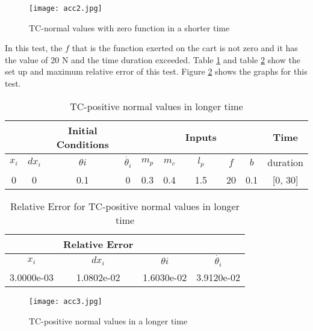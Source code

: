 \documentclass[12pt, titlepage]{article}
\begin{document}
\begin{figure}[H]
\begin{center}
\texttt{[image: acc2.jpg]}
 \caption{TC-normal values with zero function in a shorter time}
 \label{acc1}
 \end{center}
 \end{figure}


In this test, the $f$ that is the function exerted on the cart is not zero and it has the value of 20 \si{\newton} and the time duration exceeded. Table \ref{long} and table \ref{longres} show the set up and maximum relative error of this test. Figure \ref{longe30} shows the graphs for this test.


\begin{table}[ht]
\caption{TC-positive normal values in longer time} \label{long}
\vspace*{2mm}
\centering
 \begin{tabular}{|c c c c|c c c c c|c|} 
 \hline
&&\textbf{Initial Conditions}& &  &  &  \textbf{Inputs} &  &&\textbf{Time}  \\ \hline
$x_i$&$dx_i$&$\theta{i}$&$\dot{\theta_{i}}$ & $m_p$ & $m_c$ & $l_p$ & $f$ & $b$  & duration \\ \hline
0 & 0 & 0.1 & 0 & 0.3 & 0.4 & 1.5 & 20 & 0.1 &[0, 30]\\
 \hline
\end{tabular}
\end{table}	


\begin{table}[ht]
\caption{Relative Error for TC-positive normal values in longer time} \label{longres}
\vspace*{2mm}
\centering
 \begin{tabular}{|c c c c|} 
 \hline
&\textbf{Relative Error}&&\\ \hline
$x_i$&$dx_i$&$\theta{i}$&$\dot{\theta_{i}}$ \\ \hline
3.0000e-03 & 1.0802e-02 & 1.6030e-02 & 3.9120e-02
\\ \hline
\end{tabular}
\end{table}	

\begin{figure}[H]
\begin{center}
\texttt{[image: acc3.jpg]}
 \caption{TC-positive normal values in a longer time}
 \label{longe30}
 \end{center}
 \end{figure}
\end{document}
